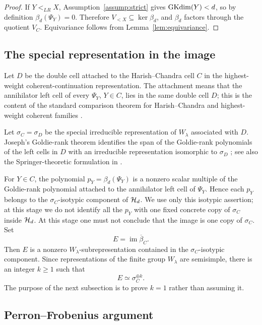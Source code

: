 \begin{proof}
If $Y <_{LR} X$, Assumption~\ref{assump:strict} gives $\operatorname{GKdim}(Y) < d$, so by
definition $\beta_d(\Psi_Y) = 0$. Therefore $V_{<X} \subseteq \ker \beta_d$,
and $\beta_d$ factors through the quotient $V_C$. Equivariance follows from
Lemma~\ref{lem:equivariance}.
\end{proof}

\subsection{The special representation in the image}

Let $D$ be the double cell attached to the Harish--Chandra cell $C$ in the
highest-weight coherent-continuation representation. The attachment means
that the annihilator left cell of every $\Psi_Y$, $Y \in C$, lies in the same
double cell $D$; this is the content of the standard comparison theorem for
Harish--Chandra and highest-weight coherent families
\cite[Lem.~4.12]{BMSZ22}.

Let $\sigma_C = \sigma_D$ be the special irreducible representation of
$W_\lambda$ associated with $D$. Joseph's Goldie-rank theorem identifies the
span of the Goldie-rank polynomials of the left cells in $D$ with an
irreducible representation isomorphic to $\sigma_D$
\cite[Prop.~3.24]{BMSZ22}; see also the Springer-theoretic formulation in
\cite{BarbaschVogan1983}.

For $Y \in C$, the polynomial $p_Y = \beta_d(\Psi_Y)$ is a nonzero scalar
multiple of the Goldie-rank polynomial attached to the annihilator left cell
of $\Psi_Y$. Hence each $p_Y$ belongs to the $\sigma_C$-isotypic component of
$\mathcal{H}_d$. We use only this isotypic assertion; at this stage we do not
identify all the $p_Y$ with one fixed concrete copy of $\sigma_C$ inside
$\mathcal{H}_d$. At this stage one must not conclude that the image is one copy of
$\sigma_C$. Set
\[
  E = \operatorname{im} \overline\beta_C.
\]
Then $E$ is a nonzero $W_\lambda$-subrepresentation contained in the
$\sigma_C$-isotypic component. Since representations of the finite group
$W_\lambda$ are semisimple, there is an integer $k \geq 1$ such that
\[
  E \simeq \sigma_C^{\oplus k}.
\]
The purpose of the next subsection is to prove $k = 1$ rather than assuming
it.

\subsection{Perron--Frobenius argument}

